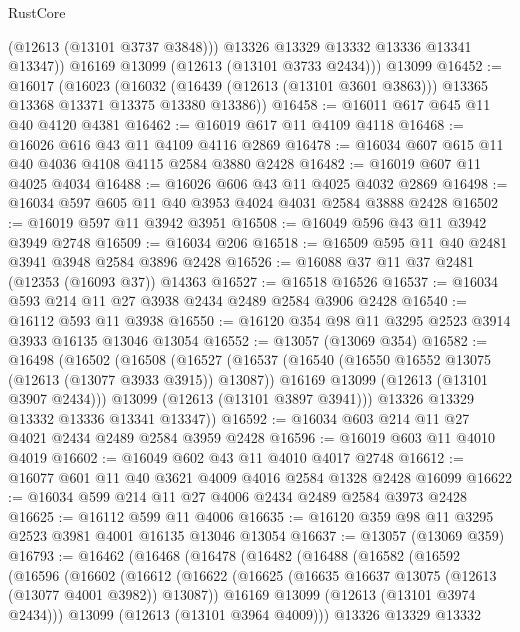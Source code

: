 \begin{lexlean}{RustCore}
\begin{coremodule}
            (@12613 (@13101 @3737 @3848)))
          @13326
          @13329
          @13332
          @13336
          @13341
          @13347))
      @16169
      @13099
      (@12613 (@13101 @3733 @2434)))
    @13099
@16452 := @16017
    (@16023
      (@16032 (@16439 (@12613 (@13101 @3601 @3863))) @13365 @13368 @13371 @13375 @13380 @13386))
@16458 := @16011 @617 @645 @11 @40 @4120 @4381
@16462 := @16019 @617 @11 @4109 @4118
@16468 := @16026 @616 @43 @11 @4109 @4116 @2869
@16478 := @16034 @607 @615 @11 @40 @4036 @4108 @4115 @2584 @3880 @2428
@16482 := @16019 @607 @11 @4025 @4034
@16488 := @16026 @606 @43 @11 @4025 @4032 @2869
@16498 := @16034 @597 @605 @11 @40 @3953 @4024 @4031 @2584 @3888 @2428
@16502 := @16019 @597 @11 @3942 @3951
@16508 := @16049 @596 @43 @11 @3942 @3949 @2748
@16509 := @16034 @206
@16518 := @16509 @595 @11 @40 @2481 @3941 @3948 @2584 @3896 @2428
@16526 := @16088 @37 @11 @37 @2481 (@12353 (@16093 @37)) @14363
@16527 := @16518 @16526
@16537 := @16034 @593 @214 @11 @27 @3938 @2434 @2489 @2584 @3906 @2428
@16540 := @16112 @593 @11 @3938
@16550 := @16120 @354 @98 @11 @3295 @2523 @3914 @3933 @16135 @13046 @13054
@16552 := @13057 (@13069 @354)
@16582 := @16498
    (@16502
      (@16508
        (@16527
          (@16537
            (@16540 (@16550 @16552 @13075 (@12613 (@13077 @3933 @3915)) @13087))
            @16169
            @13099
            (@12613 (@13101 @3907 @2434)))
          @13099
          (@12613 (@13101 @3897 @3941)))
        @13326
        @13329
        @13332
        @13336
        @13341
        @13347))
@16592 := @16034 @603 @214 @11 @27 @4021 @2434 @2489 @2584 @3959 @2428
@16596 := @16019 @603 @11 @4010 @4019
@16602 := @16049 @602 @43 @11 @4010 @4017 @2748
@16612 := @16077 @601 @11 @40 @3621 @4009 @4016 @2584 @1328 @2428 @16099
@16622 := @16034 @599 @214 @11 @27 @4006 @2434 @2489 @2584 @3973 @2428
@16625 := @16112 @599 @11 @4006
@16635 := @16120 @359 @98 @11 @3295 @2523 @3981 @4001 @16135 @13046 @13054
@16637 := @13057 (@13069 @359)
@16793 := @16462
    (@16468
      (@16478
        (@16482
          (@16488
            (@16582
              (@16592
                (@16596
                  (@16602
                    (@16612
                      (@16622
                        (@16625 (@16635 @16637 @13075 (@12613 (@13077 @4001 @3982)) @13087))
                        @16169
                        @13099
                        (@12613 (@13101 @3974 @2434)))
                      @13099
                      (@12613 (@13101 @3964 @4009)))
                    @13326
                    @13329
                    @13332

\end{coremodule}
\end{lexlean}
